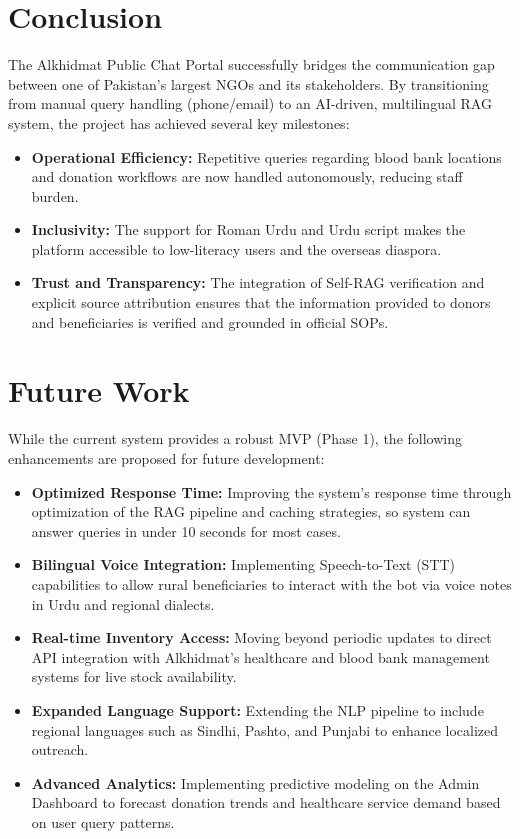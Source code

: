 \section{Conclusion}
The Alkhidmat Public Chat Portal successfully bridges the communication gap between one of Pakistan's largest NGOs and its stakeholders. By transitioning from manual query handling (phone/email) to an AI-driven, multilingual RAG system, the project has achieved several key milestones:
\begin{itemize}
    \item \textbf{Operational Efficiency:} Repetitive queries regarding blood bank locations and donation workflows are now handled autonomously, reducing staff burden.
    \item \textbf{Inclusivity:} The support for Roman Urdu and Urdu script makes the platform accessible to low-literacy users and the overseas diaspora.
    \item \textbf{Trust and Transparency:} The integration of Self-RAG verification and explicit source attribution ensures that the information provided to donors and beneficiaries is verified and grounded in official SOPs.
\end{itemize}

\section{Future Work}
While the current system provides a robust MVP (Phase 1), the following enhancements are proposed for future development:
\begin{itemize}
    \item \textbf{Optimized Response Time:} Improving the system's response time through optimization of the RAG pipeline and caching strategies, so system can answer queries in under 10 seconds for most cases.
    \item \textbf{Bilingual Voice Integration:} Implementing Speech-to-Text (STT) capabilities to allow rural beneficiaries to interact with the bot via voice notes in Urdu and regional dialects.
    \item \textbf{Real-time Inventory Access:} Moving beyond periodic updates to direct API integration with Alkhidmat’s healthcare and blood bank management systems for live stock availability.
    \item \textbf{Expanded Language Support:} Extending the NLP pipeline to include regional languages such as Sindhi, Pashto, and Punjabi to enhance localized outreach.
    \item \textbf{Advanced Analytics:} Implementing predictive modeling on the Admin Dashboard to forecast donation trends and healthcare service demand based on user query patterns.
\end{itemize}